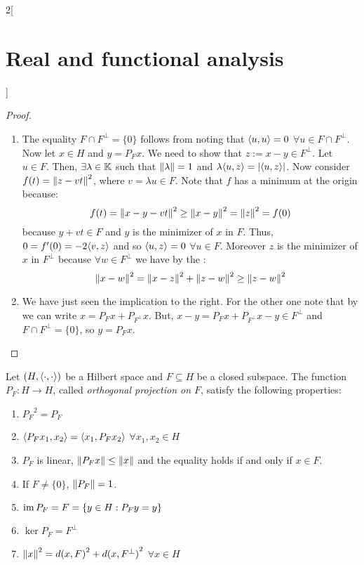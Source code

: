 \documentclass[../../../main_math.tex]{subfiles}
\begin{document}
\begin{multicols}{2}[\section{Real and functional analysis}]
\begin{important}
\begin{theorem}
    \end{theorem}
  \end{important}
  \begin{proof}
    \begin{enumerate}
      \item The equality $F\cap F^\perp=\{0\}$ follows from noting that ${\left\langle u,u\right\rangle}=0$ $\forall u\in F\cap F^\perp$. Now let $x\in H$ and $y=P_Fx$. We need to show that $z:=x-y\in F^\perp$. Let $u\in F$. Then, $\exists\lambda\in\mathbb{K}$ such that $\left\|\lambda\right\|= 1$ and $\lambda{\left\langle u,z\right\rangle}=\abs{{\left\langle u,z\right\rangle}}$. Now consider $f(t)=\left\|z-vt\right\|^2$, where $v=\lambda u\in F$. Note that $f$ has a minimum at the origin because:
            $$f(t)=\left\|x-y -vt\right\|^2\geq\left\|x-y\right\|^2=\left\|z\right\|^2=f(0)$$
            because $y+vt\in F$ and $y$ is the minimizer of  $x$ in $F$. Thus, $0=f'(0)=-2{\left\langle v,z\right\rangle}$ and so ${\left\langle u,z\right\rangle}=0$ $\forall u\in F$. Moreover $z$ is the minimizer of $x$ in $F^\perp$ because $\forall w\in F^\perp$ we have by the :
            $$\left\|x-w\right\|^2=\left\|x-z\right\|^2+\left\|z-w\right\|^2\geq \left\|z-w\right\|^2$$
      \item We have just seen the implication to the right. For the other one note that by  we can write $x=P_Fx+P_{F^\perp}x$. But, $x-y=P_Fx+P_{F^\perp}x -y\in F^\perp$ and $F\cap F^\perp=\{0\}$, so $y=P_Fx$.
    \end{enumerate}
  \end{proof}
  \begin{corollary}
    Let $(H,{\left\langle\cdot,\cdot\right\rangle})$ be a Hilbert space and $F\subseteq H$ be a closed subspace. The function $P_F:H\rightarrow H$, called \emph{orthogonal projection on $F$}, satisfy the following properties:
    \begin{enumerate}
      \item\label{RFA:corprojA} ${P_F}^2 = P_F$
      \item\label{RFA:corprojB} ${\left\langle P_Fx_1,x_2\right\rangle}={\left\langle x_1,P_Fx_2\right\rangle}$ $\forall x_1, x_2\in H$
      \item\label{RFA:corprojC} $P_F$ is linear, $\left\|P_Fx\right\|\leq \left\|x\right\|$ and the equality holds if and only if $x\in F$.
      \item If $F\ne\{0\}$, $\left\|P_F\right\|=1$.
      \item $\operatorname{im} P_F=F=\{y\in H:P_Fy=y\}$
      \item $\ker P_F=F^\perp$
      \item $\left\|x\right\|^2={d(x,F)}^2+{d(x,F^\perp)}^2$ $\forall x\in H$
    \end{enumerate}

\end{corollary}
\end{multicols}
\end{document}
